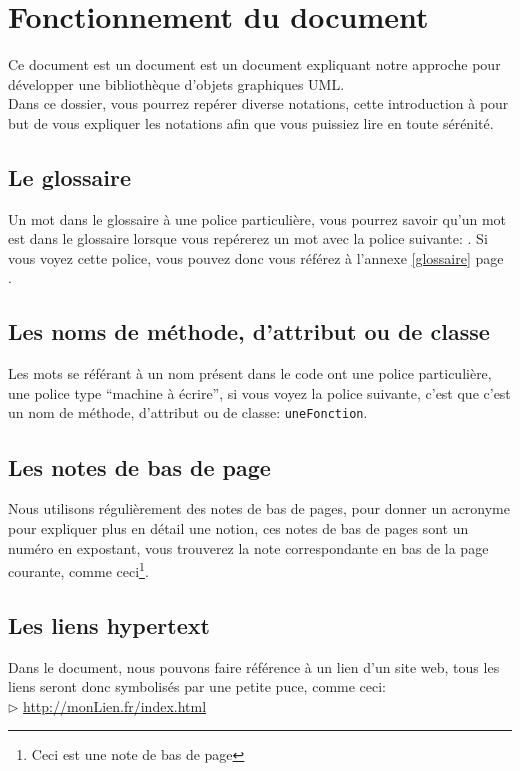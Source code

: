 \section*{Fonctionnement du document}
Ce document est un document est un document expliquant notre approche pour développer une bibliothèque d'objets graphiques UML.\\
Dans ce dossier, vous pourrez repérer diverse notations, cette introduction à pour but de vous expliquer les notations afin
que vous puissiez lire en toute sérénité.
\subsection*{Le glossaire}
Un mot dans le glossaire à une police particulière, vous pourrez savoir qu'un mot est dans le glossaire lorsque vous repérerez un mot avec la police suivante: 
. Si vous voyez cette police, vous pouvez donc vous référez à l'annexe \ref{glossaire} page \pageref{glossaire}.
\subsection*{Les noms de méthode, d'attribut ou de classe}
Les mots se référant à un nom présent dans le code ont une police particulière, une police type ``machine à écrire'', si vous voyez la police suivante, c'est que c'est un nom 
de méthode, d'attribut ou de classe: \texttt{uneFonction}.
\subsection*{Les notes de bas de page}
Nous utilisons régulièrement des notes de bas de pages, pour donner un acronyme pour expliquer plus en détail une notion, ces notes de bas de pages sont un numéro
en expostant, vous trouverez la note correspondante en bas de la page courante, comme ceci\footnote{Ceci est une note de bas de page}.
\subsection*{Les liens hypertext}
Dans le document, nous pouvons faire référence à un lien d'un site web, tous les liens seront donc symbolisés par une petite puce, comme ceci:\\
	$\rhd$ \url{http://monLien.fr/index.html}\\

